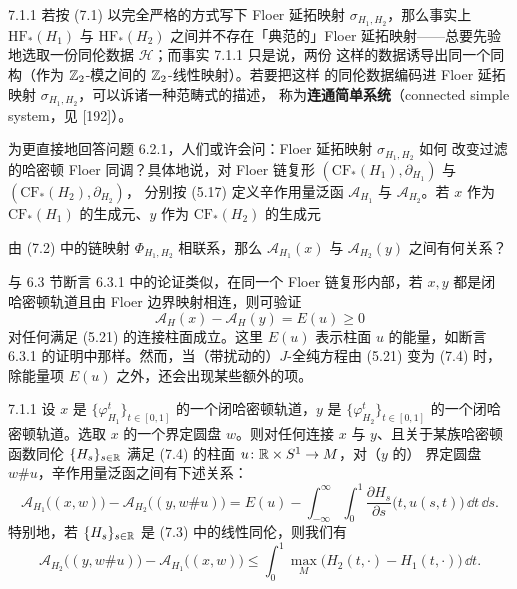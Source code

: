 \begin{wrem}{7.1.1}
  若按 (7.1) 以完全严格的方式写下 Floer 延拓映射 $\sigma_{H_1,H_2}$，那么事实上
  $\mathrm{HF}_*(H_1)$ 与 $\mathrm{HF}_*(H_2)$ 之间并不存在「典范的」Floer
  延拓映射——总要先验地选取一份同伦数据 $\mathcal{H}$；而事实 7.1.1 只是说，两份
  这样的数据诱导出同一个同构（作为 $\mathbb{Z}_2$-模之间的 $\mathbb{Z}_2$-线性映射）。若要把这样
  的同伦数据编码进 Floer 延拓映射 $\sigma_{H_1,H_2}$，可以诉诸一种范畴式的描述，
  称为\textbf{连通简单系统}（connected simple system，见 [192]）。
\end{wrem}

为更直接地回答问题 6.2.1，人们或许会问：Floer 延拓映射 $\sigma_{H_1,H_2}$ 如何
改变过滤的哈密顿 Floer 同调？具体地说，对 Floer 链复形
$(\mathrm{CF}_*(H_1),\partial_{H_1})$ 与 $(\mathrm{CF}_*(H_2),\partial_{H_2})$，
分别按 (5.17) 定义辛作用量泛函 $\mathcal{A}_{H_1}$ 与 $\mathcal{A}_{H_2}$。若
$x$ 作为 $\mathrm{CF}_*(H_1)$ 的生成元、$y$ 作为 $\mathrm{CF}_*(H_2)$ 的生成元

由 (7.2) 中的链映射 $\Phi_{H_1,H_2}$ 相联系，那么 $\mathcal{A}_{H_1}(x)$ 与
$\mathcal{A}_{H_2}(y)$ 之间有何关系？

与 6.3 节断言 6.3.1 中的论证类似，在同一个 Floer 链复形内部，若 $x,y$ 都是闭
哈密顿轨道且由 Floer 边界映射相连，则可验证
\begin{equation}\tag{7.5}
  \mathcal{A}_H(x)-\mathcal{A}_H(y)=E(u)\ge 0
\end{equation}
对任何满足 (5.21) 的连接柱面成立。这里 $E(u)$ 表示柱面 $u$ 的能量，如断言 6.3.1
的证明中那样。然而，当（带扰动的）$J$-全纯方程由 (5.21) 变为 (7.4) 时，除能量项
$E(u)$ 之外，还会出现某些额外的项。

\begin{wprop}{7.1.1}
  设 $x$ 是 $\{\varphi_{H_1}^t\}_{t\in[0,1]}$ 的一个闭哈密顿轨道，$y$ 是
  $\{\varphi_{H_2}^t\}_{t\in[0,1]}$ 的一个闭哈密顿轨道。选取 $x$ 的一个界定圆盘
  $w$。则对任何连接 $x$ 与 $y$、且关于某族哈密顿函数同伦
  $\{H_s\}_{s\in\mathbb{R}}$ 满足 (7.4) 的柱面 $u\colon\mathbb{R}\times S^1\to M$，对（$y$ 的）
  界定圆盘 $w\#u$，辛作用量泛函之间有下述关系：
  \begin{equation}\tag{7.6}
    \mathcal{A}_{H_1}\bigl((x,w)\bigr)-\mathcal{A}_{H_2}\bigl((y,w\#u)\bigr)
    =E(u)-\int_{-\infty}^{\infty}\!\!\int_0^1
    \frac{\partial H_s}{\partial s}\bigl(t,u(s,t)\bigr)\,\dd t\,\dd s.
  \end{equation}
  特别地，若 $\{H_s\}_{s\in\mathbb{R}}$ 是 (7.3) 中的线性同伦，则我们有
  \begin{equation}\tag{7.7}
    \mathcal{A}_{H_2}\bigl((y,w\#u)\bigr)-\mathcal{A}_{H_1}\bigl((x,w)\bigr)
    \le\int_0^1\max_M\bigl(H_2(t,\cdot)-H_1(t,\cdot)\bigr)\,\dd t.
  \end{equation}
\end{wprop}

